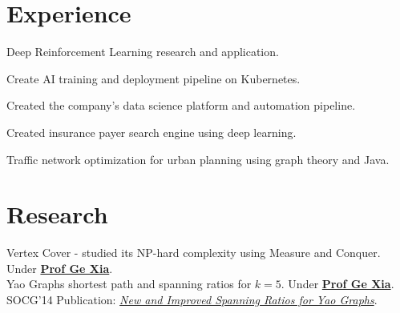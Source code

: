 \documentclass{deedy-resume-openfont}
\begin{document}
\hfill
\begin{minipage}[t]{0.66\textwidth}


\section{Experience}
\vspace{\topsep} %
\begin{tightemize}
\item Deep Reinforcement Learning research and application.
\item Create AI training and deployment pipeline on Kubernetes.
\end{tightemize}
\sectionsep

\begin{tightemize}
\item Created the company's data science platform and automation pipeline.
\item Created insurance payer search engine using deep learning.
\end{tightemize}
\sectionsep

\begin{tightemize}
\item Traffic network optimization for urban planning using graph theory and Java.
\end{tightemize}
\sectionsep



\section{Research}
Vertex Cover - studied its NP-hard complexity using Measure and Conquer. Under \textbf{\href{http://www.cs.lafayette.edu/~gexia/}{Prof Ge Xia}}. \\
\sectionsep
{}
Yao Graphs shortest path and spanning ratios for $k=5$. Under \textbf{\href{http://www.cs.lafayette.edu/~gexia/}{Prof Ge Xia}}. SOCG'14 Publication: \textit{\href{https://arxiv.org/abs/1307.5829}{New and Improved Spanning Ratios for Yao Graphs}}.
\sectionsep


\end{minipage}
\end{document}

